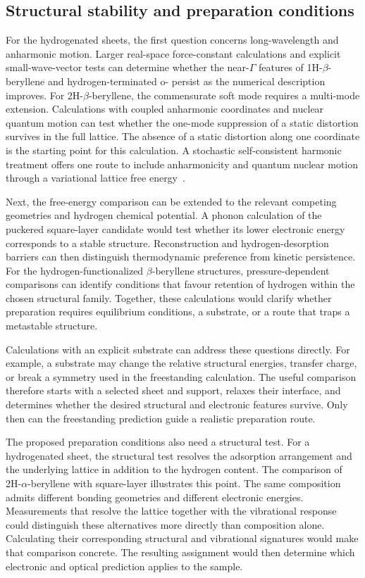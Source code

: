 \FloatBarrier
\subsection{Structural stability and preparation conditions}

For the hydrogenated sheets, the first question concerns long-wavelength and anharmonic motion.
Larger real-space force-constant calculations and explicit small-wave-vector tests can determine whether the near-$\Gamma$ features of 1H-$\beta$-beryllene and hydrogen-terminated o- persist as the numerical description improves.
For 2H-$\beta$-beryllene, the commensurate soft mode requires a multi-mode extension.
Calculations with coupled anharmonic coordinates and nuclear quantum motion can test whether the one-mode suppression of a static distortion survives in the full lattice.
The absence of a static distortion along one coordinate is the starting point for this calculation.
A stochastic self-consistent harmonic treatment offers one route to include anharmonicity and quantum nuclear motion through a variational lattice free energy~\cite{errea2014anharmonic}.

Next, the free-energy comparison can be extended to the relevant competing geometries and hydrogen chemical potential.
A phonon calculation of the puckered square-layer  candidate would test whether its lower electronic energy corresponds to a stable structure.
Reconstruction and hydrogen-desorption barriers can then distinguish thermodynamic preference from kinetic persistence.
For the hydrogen-functionalized $\beta$-beryllene structures, pressure-dependent comparisons can identify conditions that favour retention of hydrogen within the chosen structural family.
Together, these calculations would clarify whether preparation requires equilibrium conditions, a substrate, or a route that traps a metastable structure.

Calculations with an explicit substrate can address these questions directly.
For example, a substrate may change the relative structural energies, transfer charge, or break a symmetry used in the freestanding calculation.
The useful comparison therefore starts with a selected sheet and support, relaxes their interface, and determines whether the desired structural and electronic features survive.
Only then can the freestanding prediction guide a realistic preparation route.

The proposed preparation conditions also need a structural test.
For a hydrogenated sheet, the structural test resolves the adsorption arrangement and the underlying lattice in addition to the hydrogen content.
The comparison of 2H-$\alpha$-beryllene with square-layer  illustrates this point.
The same composition admits different bonding geometries and different electronic energies.
Measurements that resolve the lattice together with the vibrational response could distinguish these alternatives more directly than composition alone.
Calculating their corresponding structural and vibrational signatures would make that comparison concrete.
The resulting assignment would then determine which electronic and optical prediction applies to the sample.

